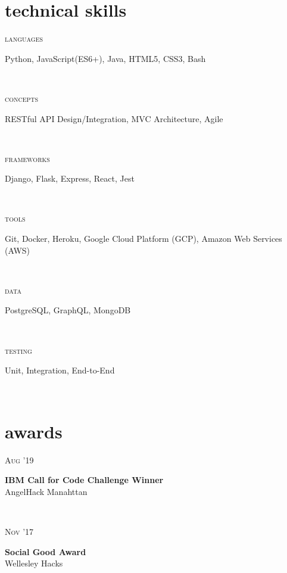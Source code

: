 \documentclass[letterpaper, 10.5pt]{article}
\newcommand{\projectentry}[4]{
    \begin{minipage}[t]{.15\linewidth}
    \hfill \textsc{#1}
    \end{minipage}
    \hfill\vline\hfill
    \begin{minipage}[t]{.80\linewidth}
    {\bf#2}
    \\ #3 
    \vspace{-1.0mm}
    \small{#4}
    \end{minipage}\\
    \vspace{.10cm}
    }
\newcommand{\skillentry}[2]{
    \begin{minipage}[t]{.15\linewidth}
        \hfill \textsc{#1}
        \end{minipage}
        \hfill\vline\hfill
        \begin{minipage}[t]{.80\linewidth}
        #2
        \end{minipage}\\
    }
\begin{document}
    \section{technical skills}

    \skillentry{languages}{Python, JavaScript(ES6+), Java, HTML5, CSS3, Bash}
    \skillentry{concepts}{RESTful API Design/Integration, MVC Architecture, Agile}
    \skillentry{frameworks}{Django, Flask, Express, React, Jest}
    \skillentry{tools}{Git, Docker, Heroku, Google Cloud Platform (GCP), Amazon Web Services (AWS) }
    \skillentry{data}{PostgreSQL, GraphQL, MongoDB}
    \skillentry{testing}{Unit, Integration, End-to-End}


    \section{awards}
    \projectentry{Aug '19}
    {IBM Call for Code Challenge Winner}
    {AngelHack Manahttan}
    {    }

    \projectentry{Nov '17}
    {Social Good Award}
    {Wellesley Hacks}
    {    }
\end{document}

